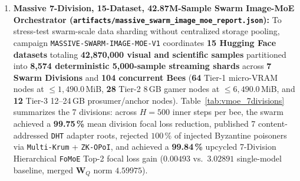 \documentclass[11pt,a4paper]{article}
\begin{document}
\begin{enumerate}[leftmargin=1.8em]
    \item \textbf{Massive 7-Division, 15-Dataset, 42.87M-Sample Swarm Image-MoE Orchestrator (\texttt{artifacts/\allowbreak massive\_\allowbreak swarm\_\allowbreak image\_\allowbreak moe\_\allowbreak report.json}):}
    To stress-test swarm-scale data sharding without centralized storage pooling, campaign \texttt{MASSIVE-SWARM-IMAGE-MOE-V1} coordinates \textbf{15 Hugging Face datasets} totaling \textbf{42{,}870{,}000 visual and scientific samples} partitioned into \textbf{8{,}574 deterministic 5{,}000-sample streaming shards} across \textbf{7 Swarm Divisions} and \textbf{104 concurrent Bees} (\textbf{64} Tier-1 micro-VRAM nodes at $\le 1{,}490.0$\,MiB, \textbf{28} Tier-2 8\,GB gamer nodes at $\le 6{,}490.0$\,MiB, and \textbf{12} Tier-3 12--24\,GB prosumer/anchor nodes). Table~\ref{tab:vmoe_7divisions} summarizes the 7 divisions: across $H=500$ inner steps per bee, the swarm achieved a \textbf{99.75\,\%} mean division focal loss reduction, published 7 content-addressed \texttt{DHT} adapter roots, rejected $100\,\%$ of injected Byzantine poisoners via \texttt{Multi-Krum} + \texttt{ZK-OPoI}, and achieved a \textbf{99.84\,\%} upcycled 7-Division Hierarchical \texttt{FoMoE} Top-2 focal loss gain ($0.00493$ vs.\ $3.02891$ single-model baseline, merged $\mathbf{W}_Q$ norm $4.59975$).
\end{enumerate}
\end{document}
